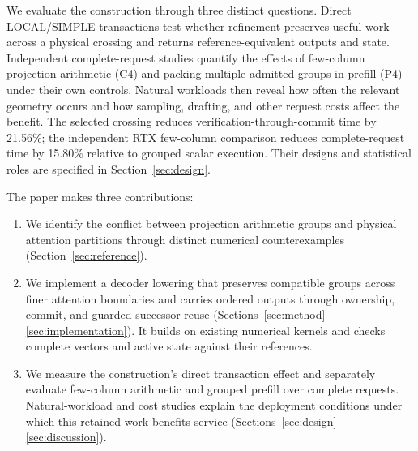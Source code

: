 We evaluate the construction through three distinct questions. Direct LOCAL/SIMPLE transactions test whether refinement preserves useful work across a physical crossing and returns reference-equivalent outputs and state. Independent complete-request studies quantify the effects of few-column projection arithmetic (C4) and packing multiple admitted groups in prefill (P4) under their own controls. Natural workloads then reveal how often the relevant geometry occurs and how sampling, drafting, and other request costs affect the benefit. The selected crossing reduces verification-through-commit time by 21.56\%; the independent RTX few-column comparison reduces complete-request time by 15.80\% relative to grouped scalar execution. Their designs and statistical roles are specified in Section~\ref{sec:design}.

The paper makes three contributions:
\begin{enumerate}
\item We identify the conflict between projection arithmetic groups and physical attention partitions through distinct numerical counterexamples (Section~\ref{sec:reference}).
\item We implement a decoder lowering that preserves compatible groups across finer attention boundaries and carries ordered outputs through ownership, commit, and guarded successor reuse (Sections~\ref{sec:method}--\ref{sec:implementation}). It builds on existing numerical kernels and checks complete vectors and active state against their references.
\item We measure the construction's direct transaction effect and separately evaluate few-column arithmetic and grouped prefill over complete requests. Natural-workload and cost studies explain the deployment conditions under which this retained work benefits service (Sections~\ref{sec:design}--\ref{sec:discussion}).
\end{enumerate}
